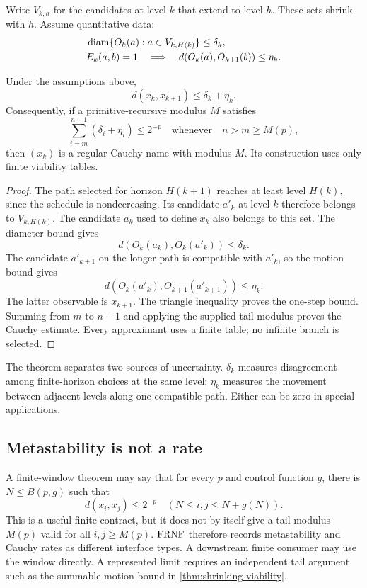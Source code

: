 Write \(V_{k,h}\) for the candidates at level \(k\) that extend to level \(h\).  These
sets shrink with \(h\).  Assume quantitative data:
\[
\begin{split}
 &\operatorname{diam}\{O_k(a):a\in V_{k,H(k)}\}\le\delta_k,\\
 &E_k(a,b)=1\quad\Longrightarrow\quad
   d(O_k(a),O_{k+1}(b))\le\eta_k.
\end{split}
\]

\begin{theorem}
\label{thm:shrinking-viability}
Under the assumptions above,
\[
   d(x_k,x_{k+1})\le\delta_k+\eta_k.
\]
Consequently, if a primitive-recursive modulus \(M\) satisfies
\[
   \sum_{i=m}^{n-1}(\delta_i+\eta_i)\le 2^{-p}
   \quad\text{whenever}\quad n>m\ge M(p),
\]
then \((x_k)\) is a regular Cauchy name with modulus \(M\).  Its construction uses
only finite viability tables.
\end{theorem}

\begin{proof}
The path selected for horizon \(H(k+1)\) reaches at least level \(H(k)\), since the
schedule is nondecreasing.  Its candidate \(a'_k\) at level \(k\) therefore belongs to
\(V_{k,H(k)}\).  The candidate \(a_k\) used to define \(x_k\) also belongs to this set.
The diameter bound gives
\[
   d(O_k(a_k),O_k(a'_k))\le\delta_k.
\]
The candidate \(a'_{k+1}\) on the longer path is compatible with \(a'_k\), so the
motion bound gives
\[
   d(O_k(a'_k),O_{k+1}(a'_{k+1}))\le\eta_k.
\]
The latter observable is \(x_{k+1}\).  The triangle inequality proves the one-step
bound.  Summing from \(m\) to \(n-1\) and applying the supplied tail modulus proves the
Cauchy estimate.  Every approximant uses a finite table; no infinite branch is
selected.
\end{proof}

The theorem separates two sources of uncertainty.  \(\delta_k\) measures disagreement
among finite-horizon choices at the same level; \(\eta_k\) measures the movement
between adjacent levels along one compatible path.  Either can be zero in special
applications.

\subsection{Metastability is not a rate}

A finite-window theorem may say that for every \(p\) and control function \(g\), there
is \(N\le B(p,g)\) such that
\[
   d(x_i,x_j)\le2^{-p}
   \quad(N\le i,j\le N+g(N)).
\]
This is a useful finite contract, but it does not by itself give a tail modulus
\(M(p)\) valid for all \(i,j\ge M(p)\).  \(\mathrm{FRNF}\) therefore records metastability and
Cauchy rates as different interface types.  A downstream finite consumer may use the
window directly.  A represented limit requires an independent tail argument such as
the summable-motion bound in \cref{thm:shrinking-viability}.

